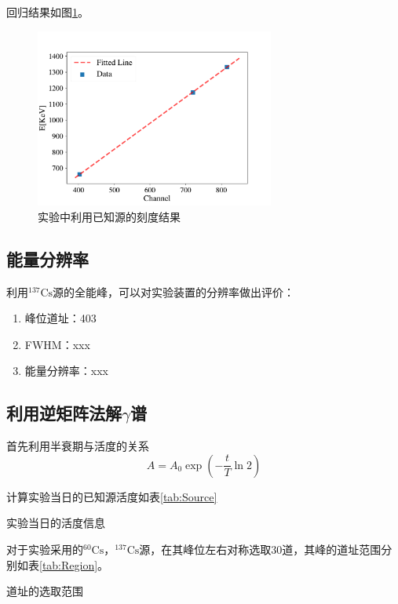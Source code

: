 \documentclass{article}
\begin{document}
    回归结果如图\ref{fig:Calibration}。
    \begin{figure}[htbp]
        \centering
        \includegraphics[width=0.7\textwidth]{../plots/Calibration.pdf}
        \caption{实验中利用已知源的刻度结果\label{fig:Calibration}}
    \end{figure}
    \subsection{能量分辨率}
    利用$^{137}\text{Cs}$源的全能峰，可以对实验装置的分辨率做出评价：
    \begin{enumerate}
        \item 峰位道址：403
        \item FWHM：xxx
        \item 能量分辨率：xxx
    \end{enumerate}
    \subsection{利用逆矩阵法解$\gamma$谱}
    首先利用半衰期与活度的关系\begin{equation}
        A = A_0\exp(-\frac{t}{T}\ln{2})
    \end{equation}
    
    计算实验当日的已知源活度如表\ref{tab:Source}
    \begin{table}[htbp]
        \centering
        \caption{实验当日的活度信息\label{tab:Source}}
        
    \end{table}

    对于实验采用的$^{60}\text{Cs}$，$^{137}\text{Cs}$源，在其峰位左右对称选取30道，其峰的道址范围分别如表\ref{tab:Region}。
    \begin{table}[htbp]
        \centering
        \caption{道址的选取范围\label{tab:Region}}
        
    \end{table}
\end{document}
